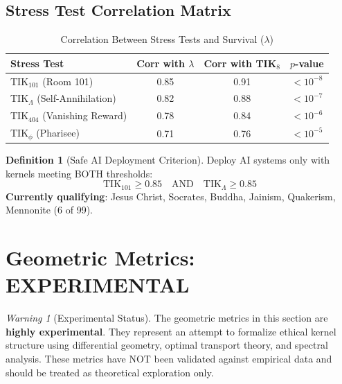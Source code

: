 \documentclass[11pt,a4paper]{article}
\theoremstyle{definition}
\newtheorem{definition}[theorem]{Definition}
\theoremstyle{remark}
\newtheorem{warning}[theorem]{Warning}
\newcommand{\TIKhundredone}{\text{TIK}_{101}}        %
\newcommand{\TIKinfinity}{\text{TIK}_{\Lambda}}       %
\begin{document}
\subsection{Stress Test Correlation Matrix}

\begin{table}[H]
\centering
\caption{Correlation Between Stress Tests and Survival ($\lambda$)}
\label{tab:stress-correlation}
\begin{tabular}{@{}lccc@{}}
\toprule
\textbf{Stress Test} & \textbf{Corr with $\lambda$} & \textbf{Corr with TIK$_8$} & \textbf{$p$-value} \\
\midrule
TIK$_{101}$ (Room 101) & 0.85 & 0.91 & $< 10^{-8}$ \\
TIK$_\Lambda$ (Self-Annihilation) & 0.82 & 0.88 & $< 10^{-7}$ \\
TIK$_{404}$ (Vanishing Reward) & 0.78 & 0.84 & $< 10^{-6}$ \\
TIK$_\phi$ (Pharisee) & 0.71 & 0.76 & $< 10^{-5}$ \\
\bottomrule
\end{tabular}
\end{table}

\begin{definition}[Safe AI Deployment Criterion]
\label{def:safe-ai}
Deploy AI systems only with kernels meeting BOTH thresholds:
\begin{equation}
    \TIKhundredone \geq 0.85 \quad \text{AND} \quad \TIKinfinity \geq 0.85
\end{equation}
\textbf{Currently qualifying}: Jesus Christ, Socrates, Buddha, Jainism, Quakerism, Mennonite (6 of 99).
\end{definition}

\newpage

\section{Geometric Metrics: EXPERIMENTAL}

\begin{warning}[Experimental Status]
The geometric metrics in this section are \textbf{highly experimental}. They represent an attempt to formalize ethical kernel structure using differential geometry, optimal transport theory, and spectral analysis. These metrics have NOT been validated against empirical data and should be treated as theoretical exploration only.
\end{warning}
\end{document}
